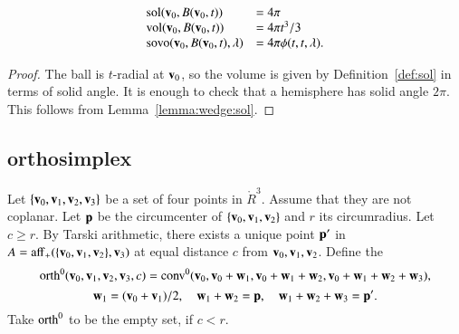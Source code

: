 \begin{lemma}  
   \begin{displaymath}
   \begin{array}{lll}
    {\operatorname{sol}}({\mathbf v}_0,B({\mathbf v}_0,t)) &= 4\pi\\
    {\operatorname{vol}}({\mathbf v}_0,B({\mathbf v}_0,t)) &= 4\pi t^3/3\\
    {\operatorname{sovo}}({\mathbf v}_0,B({\mathbf v}_0,t),\lambda) &= 4 \pi \phi(t,t,\lambda).
   \end{array}
   \end{displaymath}
\end{lemma}

\begin{proof}
The ball is $t$-radial at ${\mathbf v}_0$, so the volume is given by
Definition~\ref{def:sol} in terms of solid angle.  It is enough
to check that a hemisphere has solid angle $2\pi$.  This follows
from Lemma~\ref{lemma:wedge:sol}.
\end{proof}  




\subsection{orthosimplex}
%



\begin{definition}[orth] 
Let $\{{\mathbf v}_0,{\mathbf v}_1,{\mathbf v}_2,{\mathbf v}_3\}$ be a set of four points in $\ring{R}^3$.
Assume that they are not coplanar.  Let ${\mathbf p}$ be the circumcenter
of $\{{\mathbf v}_0,{\mathbf v}_1,{\mathbf v}_2\}$ and $r$ its circumradius.  Let $c\ge r$.
By Tarski arithmetic, %
there exists a unique point ${\mathbf p}'$ in $A={\operatorname{aff}}_+(\{{\mathbf v}_0,{\mathbf v}_1,{\mathbf v}_2\},{\mathbf v}_3)$ at equal distance $c$
from ${\mathbf v}_0,{\mathbf v}_1,{\mathbf v}_2$.  Define the 
%
%
\begin{displaymath}
    {\operatorname{orth}}^0({\mathbf v}_0,{\mathbf v}_1,{\mathbf v}_2,{\mathbf v}_3,c) = 
   {\operatorname{conv}}^0({\mathbf v}_0,{\mathbf v}_0+{\mathbf w}_1,{\mathbf v}_0+{\mathbf w}_1+{\mathbf w}_2,{\mathbf v}_0+{\mathbf w}_1+{\mathbf w}_2+{\mathbf w}_3),
\end{displaymath}
\begin{equation}\label{eqn:ortho}
     {\mathbf w}_1=({\mathbf v}_0+{\mathbf v}_1)/2,\quad {\mathbf w}_1+{\mathbf w}_2={\mathbf p},\quad {\mathbf w}_1+{\mathbf w}_2+{\mathbf w}_3={\mathbf p}'.
\end{equation}
Take ${\operatorname{orth}}^0$ to be the empty set, if $c< r$.
%
\end{definition}

